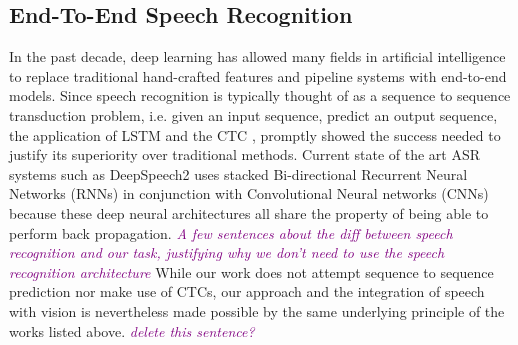 \documentclass[letterpaper]{article} %
\newcommand{\tz}[1]{\textcolor{purple}{\textit{#1}}}
\begin{document}
\subsection{End-To-End Speech Recognition}
In the past decade, deep learning has allowed many fields in artificial intelligence to replace traditional hand-crafted features and pipeline systems with end-to-end models. Since speech recognition is typically thought of as a sequence to sequence transduction problem, i.e. given an input sequence, predict an output sequence, the application of LSTM and the CTC \cite{rnn:discrimspotting}, \cite{ctc} promptly showed the success needed to justify its superiority over traditional methods. Current state of the art ASR systems such as DeepSpeech2 \cite{deepspeech2} uses stacked Bi-directional Recurrent Neural Networks (RNNs) in conjunction with Convolutional Neural networks (CNNs) because these deep neural architectures all share the property of being able to perform back propagation. \tz{A few sentences about the diff between speech recognition and our task, justifying why we don't need to use the speech recognition architecture} While our work does not attempt sequence to sequence prediction nor make use of CTCs, our approach and the integration of speech with vision is nevertheless made possible by the same underlying principle of the works listed above. \tz{delete this sentence?}
\end{document}
